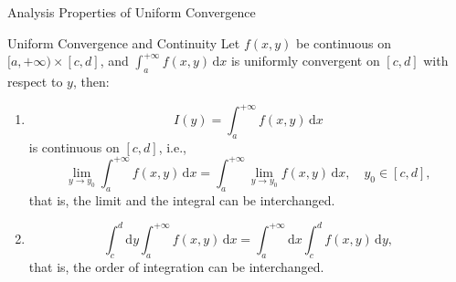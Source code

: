 \documentclass[11pt]{../../TexTemplate/elegantbook}
\begin{document}
\begin{leftbarTitle}{Analysis Properties of Uniform Convergence}\end{leftbarTitle}
\begin{lemma}
    
\end{lemma}

\begin{theorem}{Uniform Convergence and Continuity}
    Let \(f(x, y)\) be continuous on \([a, +\infty) \times [c, d]\),
    and \(\int_{a}^{+\infty} f(x, y) \, \mathrm{d}x\)
    is uniformly convergent on \([c, d]\) with respect to \(y\), then:
    \begin{enumerate}[label=(\roman*)]
        \item 
        \[
        I(y) = \int_{a}^{+\infty} f(x, y) \, \mathrm{d}x
        \] 
        is continuous on \([c, d]\), i.e.,
        \[
        \lim_{y\to y_0} \int_{a}^{+\infty} f(x, y) \, \mathrm{d}x
        = \int_{a}^{+\infty} \lim_{y\to y_0} f(x, y) \, \mathrm{d}x,
        \quad y_0 \in [c, d],
        \]
        that is, the limit and the integral can be interchanged.
        \item 
        \[
        \int_{c}^{d} \mathrm{d}y \int_{a}^{+\infty} f(x, y) \, \mathrm{d}x
        = \int_{a}^{+\infty} \mathrm{d}x \int_{c}^{d} f(x, y) \, \mathrm{d}y,
        \]
        that is, the order of integration can be interchanged.
    \end{enumerate}
\end{theorem}
\end{document}
